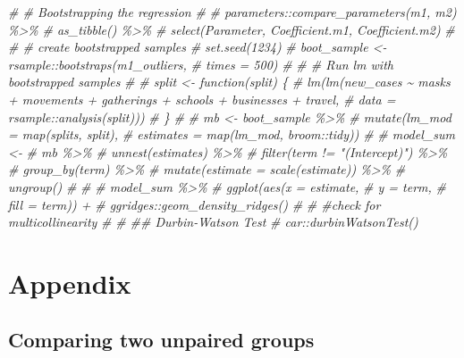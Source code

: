 \documentclass[
]{book}
\newenvironment{Shaded}{\begin{snugshade}}{\end{snugshade}}
\newcommand{\CommentTok}[1]{\textcolor[rgb]{0.56,0.35,0.01}{\textit{#1}}}
\begin{document}
\begin{Shaded}
\begin{Highlighting}[]
\CommentTok{\# \# Bootstrapping the regression}
\CommentTok{\# }
\CommentTok{\# parameters::compare\_parameters(m1, m2) \%\textgreater{}\%}
\CommentTok{\#   as\_tibble() \%\textgreater{}\%}
\CommentTok{\#   select(Parameter, Coefficient.m1, Coefficient.m2)}
\CommentTok{\# }
\CommentTok{\# \# create bootstrapped samples}
\CommentTok{\# set.seed(1234)  }
\CommentTok{\# boot\_sample \textless{}{-} rsample::bootstraps(m1\_outliers,}
\CommentTok{\#                                            times = 500)}
\CommentTok{\# }
\CommentTok{\# \# Run lm with bootstrapped samples}
\CommentTok{\# }
\CommentTok{\# split \textless{}{-} function(split) \{}
\CommentTok{\#   lm(lm(new\_cases \textasciitilde{} masks + movements + gatherings + schools + businesses + travel,}
\CommentTok{\#         data = rsample::analysis(split)))}
\CommentTok{\# \}}
\CommentTok{\# }
\CommentTok{\# mb \textless{}{-} boot\_sample \%\textgreater{}\%}
\CommentTok{\#   mutate(lm\_mod = map(splits, split),}
\CommentTok{\#          estimates = map(lm\_mod, broom::tidy))}
\CommentTok{\# }
\CommentTok{\# model\_sum \textless{}{-}}
\CommentTok{\#   mb \%\textgreater{}\%}
\CommentTok{\#   unnest(estimates) \%\textgreater{}\%}
\CommentTok{\#   filter(term != "(Intercept)") \%\textgreater{}\%}
\CommentTok{\#   group\_by(term) \%\textgreater{}\%}
\CommentTok{\#   mutate(estimate = scale(estimate)) \%\textgreater{}\%}
\CommentTok{\#   ungroup()}
\CommentTok{\# }
\CommentTok{\# }
\CommentTok{\# model\_sum \%\textgreater{}\%}
\CommentTok{\#   ggplot(aes(x = estimate,}
\CommentTok{\#              y = term,}
\CommentTok{\#              fill = term)) +}
\CommentTok{\#   ggridges::geom\_density\_ridges()}
\CommentTok{\# }
\CommentTok{\# \#check for multicollinearity}
\CommentTok{\# }
\CommentTok{\# \#\# Durbin{-}Watson Test}
\CommentTok{\# car::durbinWatsonTest()}
\end{Highlighting}
\end{Shaded}

\hypertarget{appendix}{%
\chapter*{Appendix}\label{appendix}}

\hypertarget{comparing-two-unpaired-groups}{%
\section{Comparing two unpaired groups}\label{comparing-two-unpaired-groups}}
\end{document}
